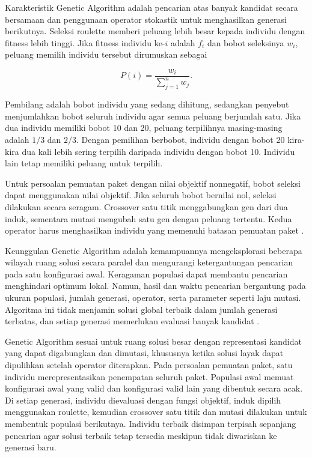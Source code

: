 Karakteristik Genetic Algorithm adalah pencarian atas banyak kandidat secara bersamaan dan penggunaan operator stokastik untuk menghasilkan generasi berikutnya. Seleksi roulette memberi peluang lebih besar kepada individu dengan fitness lebih tinggi. Jika fitness individu ke-$i$ adalah $f_i$ dan bobot seleksinya $w_i$, peluang memilih individu tersebut dirumuskan sebagai

\begin{equation}
    P(i)=\frac{w_i}{\sum_{j=1}^{n} w_j}.
    \label{eq:ga-selection}
\end{equation}

Pembilang adalah bobot individu yang sedang dihitung, sedangkan penyebut menjumlahkan bobot seluruh individu agar semua peluang berjumlah satu. Jika dua individu memiliki bobot 10 dan 20, peluang terpilihnya masing-masing adalah $1/3$ dan $2/3$. Dengan pemilihan berbobot, individu dengan bobot 20 kira-kira dua kali lebih sering terpilih daripada individu dengan bobot 10. Individu lain tetap memiliki peluang untuk terpilih.

Untuk persoalan pemuatan paket dengan nilai objektif nonnegatif, bobot seleksi dapat menggunakan nilai objektif. Jika seluruh bobot bernilai nol, seleksi dilakukan secara seragam. Crossover satu titik menggabungkan gen dari dua induk, sementara mutasi mengubah satu gen dengan peluang tertentu. Kedua operator harus menghasilkan individu yang memenuhi batasan pemuatan paket \cite{goldberg1989genetic}.

Keunggulan Genetic Algorithm adalah kemampuannya mengeksplorasi beberapa wilayah ruang solusi secara paralel dan mengurangi ketergantungan pencarian pada satu konfigurasi awal. Keragaman populasi dapat membantu pencarian menghindari optimum lokal. Namun, hasil dan waktu pencarian bergantung pada ukuran populasi, jumlah generasi, operator, serta parameter seperti laju mutasi. Algoritma ini tidak menjamin solusi global terbaik dalam jumlah generasi terbatas, dan setiap generasi memerlukan evaluasi banyak kandidat \cite{russell2021artificial,goldberg1989genetic}.

Genetic Algorithm sesuai untuk ruang solusi besar dengan representasi kandidat yang dapat digabungkan dan dimutasi, khususnya ketika solusi layak dapat dipulihkan setelah operator diterapkan. Pada persoalan pemuatan paket, satu individu merepresentasikan penempatan seluruh paket. Populasi awal memuat konfigurasi awal yang valid dan konfigurasi valid lain yang dibentuk secara acak. Di setiap generasi, individu dievaluasi dengan fungsi objektif, induk dipilih menggunakan roulette, kemudian crossover satu titik dan mutasi dilakukan untuk membentuk populasi berikutnya. Individu terbaik disimpan terpisah sepanjang pencarian agar solusi terbaik tetap tersedia meskipun tidak diwariskan ke generasi baru.

